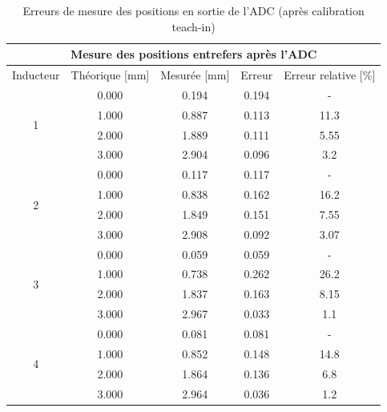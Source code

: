\begin{table}[H]
    \centering
    \begin{tabular}{|c|c|c|c|c|}
        \hline
        \multicolumn{5}{|c|}{\textbf{Mesure des positions entrefers après l'ADC}}                      \\ \hline
        Inducteur          & Théorique {[}mm{]} & Mesurée {[}mm{]} & Erreur & Erreur relative {[}\%{]} \\ \hline
        \multirow{4}{*}{1} & 0.000              & 0.194            & 0.194  & -                        \\ \cline{2-5}
                           & 1.000              & 0.887            & 0.113  & 11.3                     \\ \cline{2-5}
                           & 2.000              & 1.889            & 0.111  & 5.55                     \\ \cline{2-5}
                           & 3.000              & 2.904            & 0.096  & 3.2                      \\ \hline
        \multirow{4}{*}{2} & 0.000              & 0.117            & 0.117  & -                        \\ \cline{2-5}
                           & 1.000              & 0.838            & 0.162  & 16.2                     \\ \cline{2-5}
                           & 2.000              & 1.849            & 0.151  & 7.55                     \\ \cline{2-5}
                           & 3.000              & 2.908            & 0.092  & 3.07                     \\ \hline
        \multirow{4}{*}{3} & 0.000              & 0.059            & 0.059  & -                        \\ \cline{2-5}
                           & 1.000              & 0.738            & 0.262  & 26.2                     \\ \cline{2-5}
                           & 2.000              & 1.837            & 0.163  & 8.15                     \\ \cline{2-5}
                           & 3.000              & 2.967            & 0.033  & 1.1                      \\ \hline
        \multirow{4}{*}{4} & 0.000              & 0.081            & 0.081  & -                        \\ \cline{2-5}
                           & 1.000              & 0.852            & 0.148  & 14.8                     \\ \cline{2-5}
                           & 2.000              & 1.864            & 0.136  & 6.8                      \\ \cline{2-5}
                           & 3.000              & 2.964            & 0.036  & 1.2                      \\ \hline
    \end{tabular}
    \caption{Erreurs de mesure des positions en sortie de l'ADC (après calibration teach-in)}
    \label{tab:teachin_3_adc}
\end{table}

